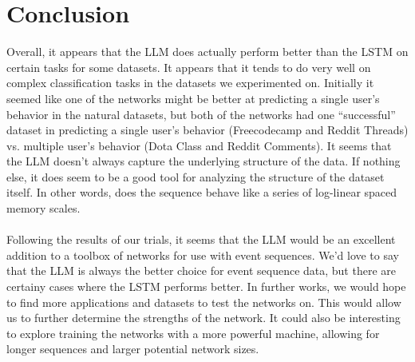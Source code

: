 \chapter{Conclusion}
\label{Conclusion}
Overall, it appears that the LLM does actually perform better than the LSTM on certain tasks for some datasets. It appears that it tends to do very well on complex classification tasks in the datasets we experimented on. Initially it seemed like one of the networks might be better at predicting a single user's behavior in the natural datasets, but both of the networks had one ``successful'' dataset in predicting a single user's behavior (Freecodecamp and Reddit Threads) vs. multiple user's behavior (Dota Class and Reddit Comments). It seems that the LLM doesn't always capture the underlying structure of the data. If nothing else, it does seem to be a good tool for analyzing the structure of the dataset itself. In other words, does the sequence behave like a series of log-linear spaced memory scales.
\\\\ Following the results of our trials, it seems that the LLM would be an excellent addition to a toolbox of networks for use with event sequences. We'd love to say that the LLM is always the better choice for event sequence data, but there are certainy cases where the LSTM performs better. In further works, we would hope to find more applications and datasets to test the networks on. This would allow us to further determine the strengths of the network. It could also be interesting to explore training the networks with a more powerful machine, allowing for longer sequences and larger potential network sizes. 